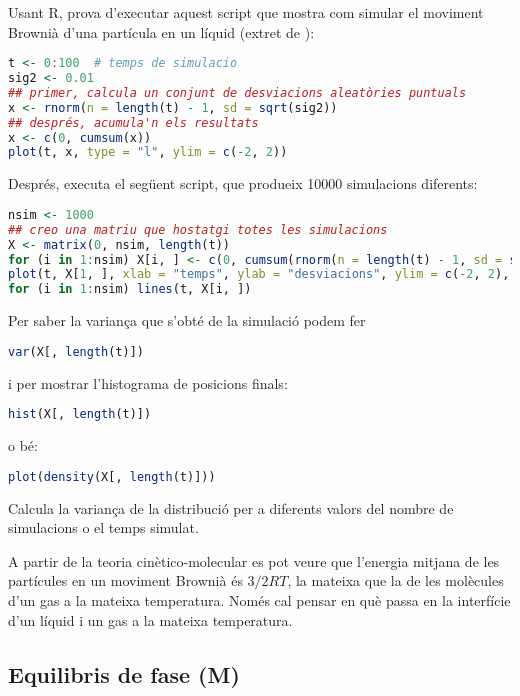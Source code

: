 \begin{exr}
Usant R, prova d'executar aquest script que mostra com simular el moviment Brownià d'una partícula en un líquid (extret de ):
\begin{lstlisting}[language=R]
t <- 0:100  # temps de simulacio
sig2 <- 0.01
## primer, calcula un conjunt de desviacions aleatòries puntuals
x <- rnorm(n = length(t) - 1, sd = sqrt(sig2))
## després, acumula'n els resultats
x <- c(0, cumsum(x))
plot(t, x, type = "l", ylim = c(-2, 2))
\end{lstlisting}

Després, executa el següent script, que produeix 10000 simulacions diferents:

\begin{lstlisting}[language=R]
nsim <- 1000
## creo una matriu que hostatgi totes les simulacions
X <- matrix(0, nsim, length(t))
for (i in 1:nsim) X[i, ] <- c(0, cumsum(rnorm(n = length(t) - 1, sd = sqrt(sig2))))
plot(t, X[1, ], xlab = "temps", ylab = "desviacions", ylim = c(-2, 2), type = "l")
for (i in 1:nsim) lines(t, X[i, ])
\end{lstlisting}
\end{exr}
\begin{exr}
Per saber la variança que s'obté de la simulació podem fer
\begin{lstlisting}[language=R]
var(X[, length(t)])
\end{lstlisting}
i per mostrar l'histograma de posicions finals:
\begin{lstlisting}[language=R]
hist(X[, length(t)])
\end{lstlisting}
o bé:
\begin{lstlisting}[language=R]
plot(density(X[, length(t)]))
\end{lstlisting}
Calcula la variança de la distribució per a diferents valors del nombre de simulacions o el temps simulat.
\end{exr}

A partir de la teoria cinètico-molecular es pot veure que l'energia mitjana de les partícules en un moviment Brownià és $3/2 RT$, la mateixa que la de les molècules d'un gas a la mateixa temperatura. Només cal pensar en què passa en la interfície d'un líquid i un gas a la mateixa temperatura.


\subsection{Equilibris de fase (M)}

